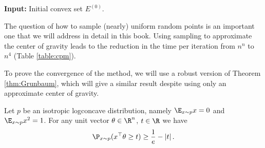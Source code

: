 \begin{algorithm2e}[H]

\caption{$\mathtt{RandomizedCenterOfGravity}$}\label{alg:randomized_cog}

\SetAlgoLined

\textbf{Input:} Initial convex set $E^{(0)}$.


\end{algorithm2e}
\begin{rem}
The question of how to sample (nearly) uniform random points is an
important one that we will address in detail in this book. Using sampling
to approximate the center of gravity leads to the reduction in the
time per iteration from $n^{n}$ to $n^{4}$ (Table \ref{table:cpm}).
\end{rem}

To prove the convergence of the method, we will use a robust version
of Theorem \ref{thm:Grunbaum}, which will give a similar result despite
using only an approximate center of gravity.
\begin{thm}
\label{thm:grun-1}Let $p$ be an isotropic logconcave distribution,
namely $\E_{x\sim p}x=0$ and $\E_{x\sim p}x^{2}=1$. For any unit
vector $\theta\in\R^{n}$, $t\in\R$ we have
\[
\P_{x\sim p}(x^{\top}\theta\geq t)\geq\frac{1}{e}-\left|t\right|.
\]
\end{thm}

